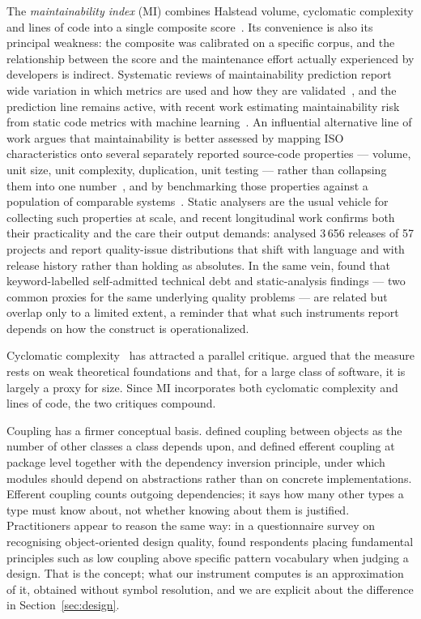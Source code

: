 \documentclass[pdflatex,sn-basic]{sn-jnl}
\begin{document}
The \emph{maintainability index} (MI) combines Halstead volume, cyclomatic complexity and lines of code into a single composite score~\citep{coleman1994}. Its convenience is also its principal weakness: the composite was calibrated on a specific corpus, and the relationship between the score and the maintenance effort actually experienced by developers is indirect. Systematic reviews of maintainability prediction report wide variation in which metrics are used and how they are validated~\citep{riaz2009,ardito2020}, and the prediction line remains active, with recent work estimating maintainability risk from static code metrics with machine learning~\citep{sengul2026}. An influential alternative line of work argues that maintainability is better assessed by mapping ISO characteristics onto several separately reported source-code properties --- volume, unit size, unit complexity, duplication, unit testing --- rather than collapsing them into one number~\citep{heitlager2007}, and by benchmarking those properties against a population of comparable systems~\citep{baggen2012}. Static analysers are the usual vehicle for collecting such properties at scale, and recent longitudinal work confirms both their practicality and the care their output demands: \citet{berciu2026} analysed 3\,656 releases of 57 projects and report quality-issue distributions that shift with language and with release history rather than holding as absolutes. In the same vein, \citet{rantala2024} found that keyword-labelled self-admitted technical debt and static-analysis findings --- two common proxies for the same underlying quality problems --- are related but overlap only to a limited extent, a reminder that what such instruments report depends on how the construct is operationalized.

Cyclomatic complexity~\citep{mccabe1976} has attracted a parallel critique. \citet{shepperd1988} argued that the measure rests on weak theoretical foundations and that, for a large class of software, it is largely a proxy for size. Since MI incorporates both cyclomatic complexity and lines of code, the two critiques compound.

Coupling has a firmer conceptual basis. \citet{chidamber1994} defined coupling between objects as the number of other classes a class depends upon, and \citet{martin2003} defined efferent coupling at package level together with the dependency inversion principle, under which modules should depend on abstractions rather than on concrete implementations. Efferent coupling counts outgoing dependencies; it says how many other types a type must know about, not whether knowing about them is justified. Practitioners appear to reason the same way: in a questionnaire survey on recognising object-oriented design quality, \citet{stevenson2018} found respondents placing fundamental principles such as low coupling above specific pattern vocabulary when judging a design. That is the concept; what our instrument computes is an approximation of it, obtained without symbol resolution, and we are explicit about the difference in Section~\ref{sec:design}.
\end{document}
